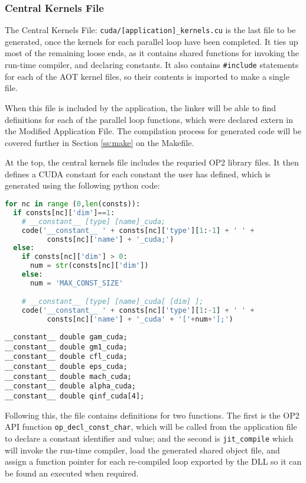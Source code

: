 \subsubsection{Central Kernels File}
\label{sss:mkf}
The Central Kernels File: \verb|cuda/[application]_kernels.cu| is the last file to be generated, once the kernels for each parallel loop have been completed. It ties up most of the remaining loose ends, as it contains shared functions for invoking the run-time compiler, and declaring constants. It also contains \verb|#include| statements for each of the AOT kernel files, so their contents is imported to make a single file.
\par
When this file is included by the application, the linker will be able to find definitions for each of the parallel loop functions, which were declared extern in the Modified Application File. The compilation process for generated code will be covered further in Section \ref{ss:make} on the Makefile.
\par
At the top, the central kernels file includes the requried OP2 library files. It then defines a CUDA constant for each constant the user has defined, which is generated using the following python code:\\
\begin{lstlisting}[backgroundcolor = \color{lightgray!20}, language=Python]
for nc in range (0,len(consts)):
  if consts[nc]['dim']==1:
    # __constant__ [type] [name]_cuda;
    code('__constant__ ' + consts[nc]['type'][1:-1] + ' ' +
          consts[nc]['name'] + '_cuda;')
  else:
    if consts[nc]['dim'] > 0:
      num = str(consts[nc]['dim'])
    else:
      num = 'MAX_CONST_SIZE'

    # __constant__ [type] [name]_cuda[ [dim] ];
    code('__constant__ ' + consts[nc]['type'][1:-1] + ' ' +
          consts[nc]['name'] + '_cuda' + '['+num+'];')
\end{lstlisting}
\clearpage

\begin{lstlisting}
__constant__ double gam_cuda;
__constant__ double gm1_cuda;
__constant__ double cfl_cuda;
__constant__ double eps_cuda;
__constant__ double mach_cuda;
__constant__ double alpha_cuda;
__constant__ double qinf_cuda[4];
\end{lstlisting}
\vspace{-1cm}

Following this, the file contains definitions for two functions. The first is the OP2 API function \verb|op_decl_const_char|, which will be called from the application file to declare a constant identifier and value; and the second is \verb|jit_compile| which will invoke the run-time compiler, load the generated shared object file, and assign a function pointer for each re-compiled loop exported by the DLL so it can be found an executed when required.

